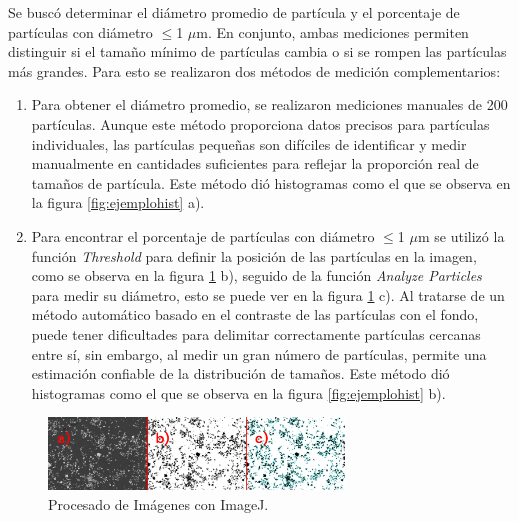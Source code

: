 \documentclass[../main.tex]{subfiles}
\begin{document}
Se buscó determinar el diámetro promedio de partícula y el porcentaje de partículas con diámetro $\leq$1 $\mu$m. En conjunto, ambas mediciones permiten distinguir si el tamaño mínimo de partículas cambia o si se rompen las partículas más grandes. Para esto se realizaron dos métodos de medición complementarios:
\begin{enumerate}
    \item Para obtener el diámetro promedio, se realizaron mediciones manuales de 200 partículas. Aunque este método proporciona datos precisos para partículas individuales, las partículas pequeñas son difíciles de identificar y medir manualmente en cantidades suficientes para reflejar la proporción real de tamaños de partícula. Este método dió histogramas como el que se observa en la figura \ref{fig:ejemplohist} a).
    \item Para encontrar el porcentaje de partículas con diámetro $\leq$1 $\mu$m se utilizó la función \textit{Threshold} para definir la posición de las partículas en la imagen, como se observa en la figura \ref{fig:imgjcomp} b), seguido de la función \textit{Analyze Particles} para medir su diámetro, esto se puede ver en la figura \ref{fig:imgjcomp} c). Al tratarse de un método automático basado en el contraste de las partículas con el fondo, puede tener dificultades para delimitar correctamente partículas cercanas entre sí, sin embargo, al medir un gran número de partículas,  permite una estimación confiable de la distribución de tamaños. Este método dió histogramas como el que se observa en la figura \ref{fig:ejemplohist} b).
\end{enumerate}
\begin{figure}[H]
    \centering
    \includegraphics[width=0.7\textwidth]{fig/imagejcomp.png}
    \caption{Procesado de Imágenes con ImageJ.}
    \label{fig:imgjcomp}
\end{figure}
\end{document}
